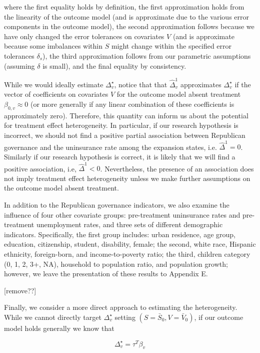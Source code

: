 \documentclass[aoas]{imsart}
\theoremstyle{plain}
\theoremstyle{remark}
\begin{document}
where the first equality holds by definition, the first approximation holds from the linearity of the outcome model (and is approximate due to the various error components in the outcome model), the second approximation follows because we have only changed the error tolerances on covariates $V$ (and is approximate because some imbalances within $S$ might change within the specified error tolerances $\delta_s$), the third approximation follows from our parametric assumptions (assuming $\delta$ is small), and the final equality by consistency. 

While we would ideally estimate $\Delta^\star_v$, notice that that $\hat{\Delta}^1_v$ approximates $\Delta^\star_v$ if the vector of coefficients on covariates $V$ for the outcome model absent treatment $\beta_{0, v} \approx 0$ (or more generally if any linear combination of these coefficients is approximately zero). Therefore, this quantity can inform us about the potential for treatment effect heterogeneity. In particular, if our research hypothesis is incorrect, we should not find a positive partial association between Republican governance and the uninsurance rate among the expansion states, i.e. $\hat{\Delta}^1 = 0$. Similarly if our research hypothesis is correct, it is likely that we will find a positive association, i.e, $\hat{\Delta}^1 < 0$. Nevertheless, the presence of an association does not imply treatment effect heterogeneity unless we make further assumptions on the outcome model absent treatment.

In addition to the Republican governance indicators, we also examine the influence of four other covariate groups: pre-treatment uninsurance rates and pre-treatment unemployment rates, and three sets of different demographic indicators. Specifically, the first group includes: urban residence, age group, education, citizenship, student, disability, female; the second, white race, Hispanic ethnicity, foreign-born, and income-to-poverty ratio; the third, children category (0, 1, 2, 3+, NA), household to population ratio, and population growth; however, we leave the presentation of these results to Appendix E.

[remove??]

Finally, we consider a more direct approach to estimating the heterogeneity. While we cannot directly target $\Delta^\star_v$ setting $(S = \bar{S}_0, V = \bar{V}_0)$, if our outcome model holds generally we know that

$$
\Delta^\star_v = \tau^T\beta_v
$$
\end{document}
